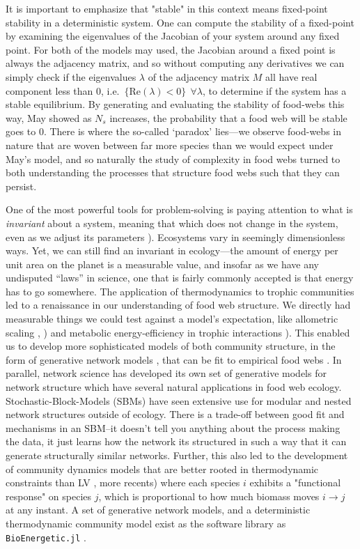 \documentclass[]{article}
\begin{document}
It is important to emphasize that "stable" in this context means
fixed-point stability in a deterministic system. One can compute the
stability of a fixed-point by examining the eigenvalues of the Jacobian
of your system around any fixed point. For both of the models may used,
the Jacobian around a fixed point is always the adjacency matrix, and so
without computing any derivatives we can simply check if the eigenvalues
\(\lambda\) of the adjacency matrix \(M\) all have real component less
than \(0\), i.e.~\(\{ \text{Re}(\lambda) < 0 \} \ \ \forall\lambda\), to
determine if the system has a stable equilibrium. By generating and
evaluating the stability of food-webs this way, May showed as \(N_s\)
increases, the probability that a food web will be stable goes to \(0\).
There is where the so-called `paradox' lies---we observe food-webs in
nature that are woven between far more species than we would expect
under May's model, and so naturally the study of complexity in food webs
turned to both understanding the processes that structure food webs such
that they can persist.

One of the most powerful tools for problem-solving is paying attention
to what is \emph{invariant} about a system, meaning that which does not
change in the system, even as we adjust its parameters
\citep{@polya_how_2009}). Ecosystems vary in seemingly dimensionless ways.
Yet, we can still find an invariant in ecology---the amount of energy
per unit area on the planet is a measurable value, and insofar as we
have any undisputed ``laws'' in science, one that is fairly commonly
accepted is that energy has to go somewhere. The application of
thermodynamics to trophic communities led to a renaissance in our
understanding of food web structure. We directly had measurable things
we could test against a model's expectation, like allometric scaling
\citep{cohen_food_1977, gravel_trophic_2011},
\citep{stouffer_robust_2006}) and metabolic energy-efficiency in
trophic interactions \citep{yodzis_body_1992}). This enabled us to
develop more sophisticated models of both community structure, in the
form of generative network models \citep{cohen_food_1977},
\citep{williams_simple_2000} that can be fit to empirical food webs
\citep{allesina_general_2008}. In parallel, network science has developed
its own set of generative models for network structure which have
several natural applications in food web ecology.
Stochastic-Block-Models (SBMs) have seen extensive use for modular and
nested network structures outside of ecology. There is a trade-off
between good fit and mechanisms in an SBM--it doesn't tell you anything
about the process making the data, it just learns how the network its
structured in such a way that it can generate structurally similar
networks. Further, this also led to the development of community
dynamics models that are better rooted in thermodynamic constraints than
LV \citep{yodzis_body_1992}, more recents) where each species
\(i\) exhibits a "functional response" on species \(j\), which is
proportional to how much biomass moves \(i \to j\) at any instant. A set
of generative network models, and a deterministic thermodynamic
community model exist as the software library as
\texttt{BioEnergetic.jl} \citep{delmas_simulation_2017}.
\end{document}
